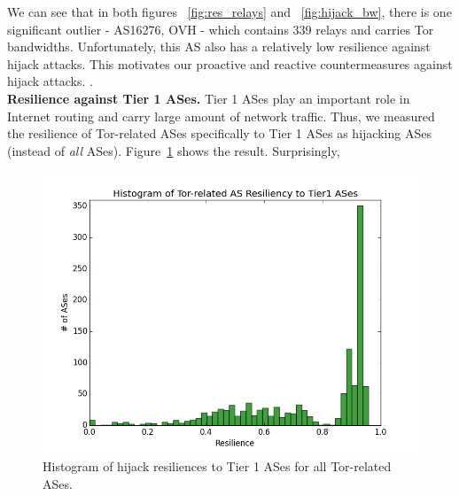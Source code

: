 We can see that in both figures ~\ref{fig:res_relays} and ~\ref{fig:hijack_bw}, there is one significant outlier - AS16276, OVH - which contains 339 relays and carries  Tor bandwidths. Unfortunately, this AS also has a relatively low resilience against hijack attacks.  This motivates our proactive and reactive countermeasures against hijack attacks. .\\




{\bf Resilience against Tier 1 ASes.} Tier 1 ASes play an important role in Internet routing and carry large amount of network traffic. Thus, we measured the resilience of Tor-related ASes specifically to Tier 1 ASes as hijacking ASes (instead of \emph{all} ASes). Figure~\ref{fig:resilience_histogram_tier1} shows the result. Surprisingly, 

\begin{figure}[ht!]
\centering
\includegraphics[width=.4\textwidth]{hijack_tier1}
\caption{Histogram of hijack resiliences to Tier 1 ASes for all Tor-related ASes.}
\label{fig:resilience_histogram_tier1}
\end{figure}


